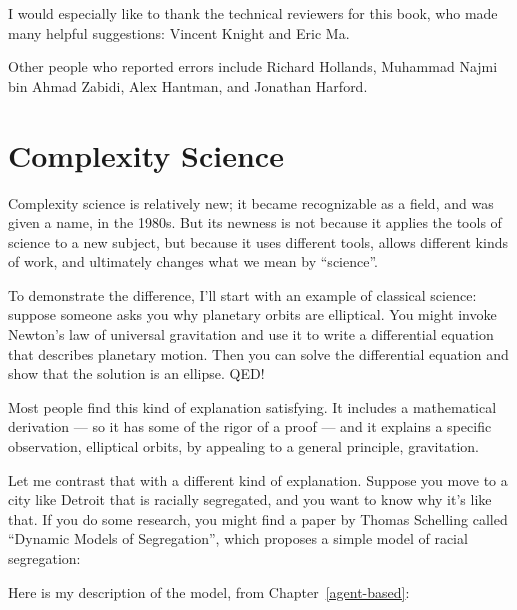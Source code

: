 \documentclass[12pt]{book}
\theoremstyle{exercise}
\begin{document}
I would especially like to thank the technical reviewers for this book, who made many helpful suggestions: Vincent Knight and Eric Ma.

Other people who reported errors include
Richard Hollands,
Muhammad Najmi bin Ahmad Zabidi,
Alex Hantman, and
Jonathan Harford.




\normalsize



\mainmatter

\chapter{Complexity Science}
\label{overview}

Complexity science is relatively new; it became recognizable as a
field, and was given a name, in the 1980s.  But its newness is not because it
applies the tools of science to a new subject, but because it uses
different tools, allows different kinds of work, and ultimately
changes what we mean by ``science''.


To demonstrate the difference, I'll start with an example of classical
science: suppose someone asks you why planetary orbits are
elliptical.  You might invoke Newton's law of universal
gravitation and use it to write a differential equation that describes
planetary motion.  Then you can solve the differential equation and
show that the solution is an ellipse.  QED!


Most people find this kind of explanation satisfying.  It includes a
mathematical derivation --- so it has some of the rigor of a proof --- and
it explains a specific observation, elliptical orbits, by appealing to
a general principle, gravitation.


Let me contrast that with a different kind of explanation.  Suppose
you move to a city like Detroit that is racially segregated, and you
want to know why it's like that.  If you do some research, you might
find a paper by Thomas Schelling called ``Dynamic Models of
Segregation'', which proposes a simple model of racial segregation:


Here is my description of the model, from Chapter~\ref{agent-based}:
\end{document}
